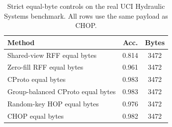 \begin{table}[t]
\centering
\caption{Strict equal-byte controls on the real UCI Hydraulic Systems benchmark. All rows use the same payload as CHOP.}
\label{tab:strict-equal-byte-hydraulic}
\begin{tabular}{lcc}
\toprule
Method & Acc. & Bytes \\
\midrule
Shared-view RFF equal bytes & 0.814 & 3472 \\
Zero-fill RFF equal bytes & 0.961 & 3472 \\
CProto equal bytes & 0.983 & 3472 \\
Group-balanced CProto equal bytes & 0.983 & 3472 \\
Random-key HOP equal bytes & 0.976 & 3472 \\
CHOP equal bytes & 0.982 & 3472 \\
\bottomrule
\end{tabular}
\end{table}
